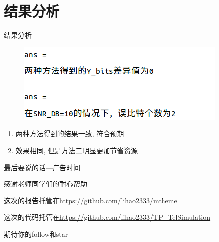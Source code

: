\documentclass[UTF8]{ctexbeamer}
\begin{document}
  \section{结果分析}
  \begin{frame}{结果分析}
	\begin{figure}
	  \includegraphics[width=\textwidth]{figure/result.png}
	\end{figure}
	\begin{enumerate}
	  \item 两种方法得到的结果一致, 符合预期
	  \item	效果相同, 但是方法二明显更加节省资源
	\end{enumerate}
  \end{frame}
  \begin{frame}{最后要说的话---广告时间}
	\begin{itemsize}
	  \item 感谢老师同学们的耐心帮助
	  \item	这次的报告托管在\url{https://github.com/lihao2333/mtheme}
	  \item	这次的代码托管在\url{https://github.com/lihao2333/TP_TelSimulation}
	  \item 期待你的follow和star
	\end{itemsize}

  \end{frame}
\end{document}
